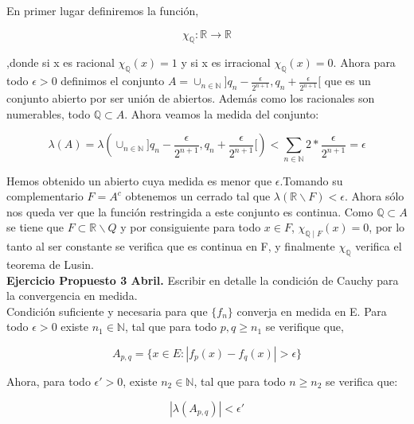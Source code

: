 \documentclass{article}
\begin{document}
En primer lugar definiremos la función,

\begin{equation*}
\chi_\mathbb{Q}:\mathbb{R} \rightarrow \mathbb{R}
\end{equation*}

,donde si x es racional $\chi_\mathbb{Q}(x) = 1$ y si x es irracional $\chi_\mathbb{Q}(x)=0$. Ahora para todo $\epsilon > 0$ definimos el conjunto $A = \cup_{n \in \mathbb{N}} ]q_n - \frac{\epsilon}{2^{n+1}},q_n + \frac{\epsilon}{2^{n+1}}[$ que es un conjunto abierto por ser unión de abiertos. Además como los racionales son numerables, todo $\mathbb{Q} \subset A$. Ahora veamos la medida del conjunto:

\begin{equation}
\lambda(A)=\lambda(\cup_{n \in \mathbb{N}} ]q_n - \frac{\epsilon}{2^{n+1}},q_n + \frac{\epsilon}{2^{n+1}}[) < \sum_{n \in \mathbb{N}} 2*\frac{\epsilon}{2^{n+1}} = \epsilon
\end{equation}

Hemos obtenido un abierto cuya medida es menor que $\epsilon$.Tomando su complementario $F = A^c$ obtenemos un cerrado tal que $\lambda(\mathbb{R}\backslash F) < \epsilon$. Ahora sólo nos queda ver que la función restringida a este conjunto es continua. Como $\mathbb{Q} \subset A$ se tiene que $F \subset \mathbb{R}\backslash Q$ y por consiguiente para todo $x \in F$, $\chi_{\mathbb{Q}\mid F}(x) = 0$, por lo tanto al ser constante se verifica que es continua en F, y finalmente $\chi_\mathbb{Q}$ verifica el teorema de Lusin. \\

\textbf{Ejercicio Propuesto 3 Abril.} Escribir en detalle la condición de Cauchy para la convergencia en medida. \\

Condición suficiente y necesaria para que $\{f_n \}$ converja en medida en E. Para todo $\epsilon > 0$ existe $n_1 \in \mathbb{N}$, tal que para todo $p,q \geq n_1$ se verifique que,

\begin{equation}
A_{p,q} = \{x \in E: |f_p(x) - f_q(x)| > \epsilon\}
\end{equation}

Ahora, para todo $\epsilon' > 0$, existe $n_2 \in \mathbb{N}$, tal que para todo $n \geq n_2$ se verifica que:

\begin{equation}
|\lambda(A_{p,q})| < \epsilon'
\end{equation}
\end{document}
